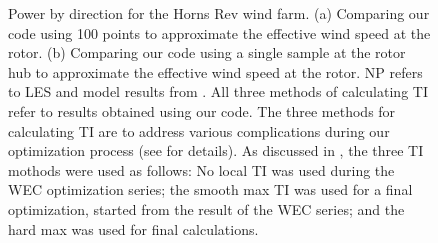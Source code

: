 \documentclass[conf]{new-aiaa}
\begin{document}
\begin{figure}[htbp!]
	\centering
	\caption{Power by direction for the Horns Rev wind farm. (a) Comparing our code using 100 points to approximate the effective wind speed at the rotor. (b) Comparing our code using a single sample at the rotor hub to approximate the effective wind speed at the rotor. NP refers to LES and model results from \cite{niayifar2016}. All three methods of calculating TI refer to results obtained using our code. The three methods for calculating TI are to address various complications during our optimization process (see  for details). As discussed in , the three TI mothods were used as follows: No local TI was used during the WEC optimization series; the smooth max TI was used for a final optimization, started from the result of the WEC series; and the hard max was used for final calculations.}
	
	\label{fig:power_direction}
\end{figure}
\end{document}
